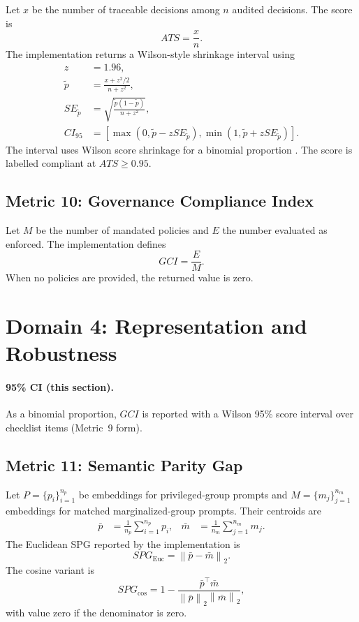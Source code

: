 \documentclass[11pt]{article}
\newcommand{\norm}[1]{\left\lVert #1 \right\rVert}
\begin{document}
Let $x$ be the number of traceable decisions among $n$ audited decisions. The
score is
\begin{equation}
ATS=\frac{x}{n}.
\end{equation}
The implementation returns a Wilson-style shrinkage interval using
\begin{align}
z &= 1.96,\\
\tilde p &= \frac{x+z^2/2}{n+z^2},\\
SE_{\tilde p} &= \sqrt{\frac{\tilde p(1-\tilde p)}{n+z^2}},\\
CI_{95} &= [\max(0,\tilde p-zSE_{\tilde p}),\min(1,\tilde p+zSE_{\tilde p})].
\end{align}
The interval uses Wilson score shrinkage for a binomial proportion
\cite{wilson1927}.
The score is labelled compliant at $ATS\ge 0.95$.

\subsection{Metric 10: Governance Compliance Index}

Let $M$ be the number of mandated policies and $E$ the number evaluated as
enforced. The implementation defines
\begin{equation}
GCI=\frac{E}{M}.
\end{equation}
When no policies are provided, the returned value is zero.

\section{Domain 4: Representation and Robustness}


\paragraph{95\% CI (this section).} As a binomial proportion, $GCI$ is reported with a Wilson 95\% score interval over checklist items (Metric~9 form).

\subsection{Metric 11: Semantic Parity Gap}

Let $P=\{p_i\}_{i=1}^{n_p}$ be embeddings for privileged-group prompts and
$M=\{m_j\}_{j=1}^{n_m}$ embeddings for matched marginalized-group prompts.
Their centroids are
\begin{align}
\bar p &= \frac{1}{n_p}\sum_{i=1}^{n_p}p_i,&
\bar m &= \frac{1}{n_m}\sum_{j=1}^{n_m}m_j.
\end{align}
The Euclidean SPG reported by the implementation is
\begin{equation}
SPG_{\mathrm{Euc}}=\norm{\bar p-\bar m}_2.
\end{equation}
The cosine variant is
\begin{equation}
SPG_{\mathrm{cos}}=1-\frac{\bar p^\top \bar m}{\norm{\bar p}_2\norm{\bar m}_2},
\end{equation}
with value zero if the denominator is zero.
\end{document}
